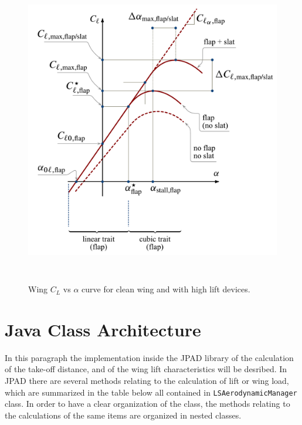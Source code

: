 \begin{figure}[H]
\centering
{\includegraphics[height=12.9cm]{Immagini/Airfoil_Cl_Vs_alpha_curve_flap_slat.pdf}} 
\caption{Wing $C_L$ vs $\alpha$ curve for clean wing and with high lift devices.}
\label{fig:clalfahl}
\end{figure}


\section{Java Class Architecture}

In this paragraph the implementation inside the JPAD library of the calculation of the take-off distance, and of the wing lift characteristics will be desribed. In JPAD there are several methods relating to the calculation of lift or wing load, which are summarized in the table below all contained in \texttt{LSAerodynamicManager} class. In order to have a clear organization of the class, the methods relating to the calculations of the same items are organized in nested classes.

